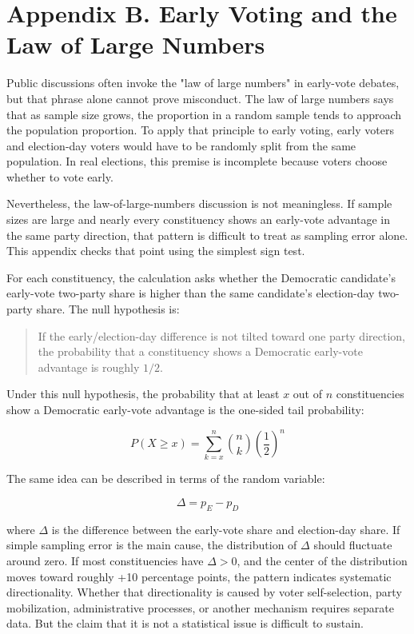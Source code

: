 \documentclass[preprint]{IEIE}
\begin{document}
\section*{Appendix B. Early Voting and the Law of Large Numbers}

Public discussions often invoke the "law of large numbers" in early-vote debates, but that phrase alone cannot prove misconduct. The law of large numbers says that as sample size grows, the proportion in a random sample tends to approach the population proportion. To apply that principle to early voting, early voters and election-day voters would have to be randomly split from the same population. In real elections, this premise is incomplete because voters choose whether to vote early.

Nevertheless, the law-of-large-numbers discussion is not meaningless. If sample sizes are large and nearly every constituency shows an early-vote advantage in the same party direction, that pattern is difficult to treat as sampling error alone. This appendix checks that point using the simplest sign test.

For each constituency, the calculation asks whether the Democratic candidate's early-vote two-party share is higher than the same candidate's election-day two-party share. The null hypothesis is:

\begin{quote}
If the early/election-day difference is not tilted toward one party direction, the probability that a constituency shows a Democratic early-vote advantage is roughly \(1/2\).
\end{quote}

Under this null hypothesis, the probability that at least \(x\) out of \(n\) constituencies show a Democratic early-vote advantage is the one-sided tail probability:

\[
P(X \ge x) = \sum_{k=x}^{n} \binom{n}{k}\left(\frac{1}{2}\right)^n
\]

The same idea can be described in terms of the random variable:

\[
\Delta = p_E - p_D
\]

where \(\Delta\) is the difference between the early-vote share and election-day share. If simple sampling error is the main cause, the distribution of \(\Delta\) should fluctuate around zero. If most constituencies have \(\Delta>0\), and the center of the distribution moves toward roughly +10 percentage points, the pattern indicates systematic directionality. Whether that directionality is caused by voter self-selection, party mobilization, administrative processes, or another mechanism requires separate data. But the claim that it is not a statistical issue is difficult to sustain.
\end{document}
